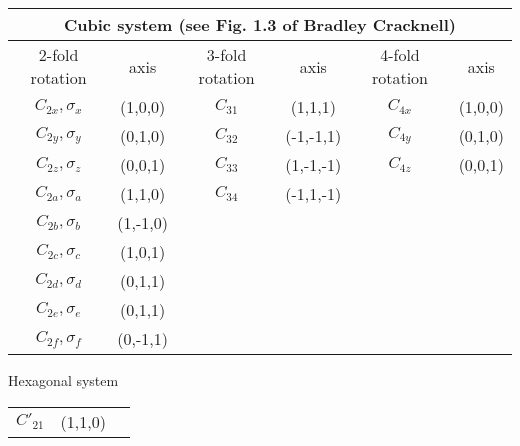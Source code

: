 \documentclass[11pt,a4paper]{report}
\begin{document}
\begin{center}
\begin{tabular}{||c|c|||c|c||c|c||}
\hline
\multicolumn{6}{|c|}{Cubic system (see Fig. 1.3 of Bradley Cracknell\cite{bradley72_book})}\\
\hline
2-fold rotation & axis & 3-fold rotation & axis &4-fold rotation & axis \\
\hline
$C_{2x},\sigma_x$ & (1,0,0)  & $C_{31}$ & (1,1,1)  &   $C_{4x}$ & (1,0,0)\\  
$C_{2y},\sigma_y$ & (0,1,0)  & $C_{32}$ & (-1,-1,1)&   $C_{4y}$ & (0,1,0)\\  
$C_{2z},\sigma_z$ & (0,0,1)  & $C_{33}$ & (1,-1,-1)&   $C_{4z}$ & (0,0,1)\\  
$C_{2a},\sigma_a$ & (1,1,0)  & $C_{34}$ & (-1,1,-1)&           &\\  
$C_{2b},\sigma_b$ & (1,-1,0) &         &    & &\\
$C_{2c},\sigma_c$ & (1,0,1)  &         &  & &\\
$C_{2d},\sigma_d$ & (0,1,1)  &         &  & &\\
$C_{2e},\sigma_e$ & (0,1,1)  &         &  & &\\
$C_{2f},\sigma_f$ & (0,-1,1) &         &  & &\\
\hline
\end{tabular}
\end{center}

Hexagonal system
\begin{center}
\begin{tabular}{|c|c|l|}
$C'_{21}$ & (1,1,0) \\
\end{tabular}
\end{center}
\end{document}
